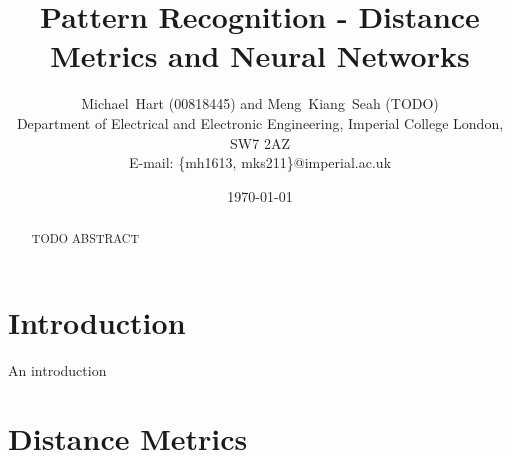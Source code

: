 \documentclass[a4paper, 10pt, conference]{ieeeconf}
\begin{document}
\title{Pattern Recognition - Distance Metrics and Neural Networks}
\author{Michael~Hart (00818445) and
        Meng~Kiang~Seah (TODO)
\\
        Department of Electrical and Electronic Engineering, 
        Imperial College London, 
        SW7 2AZ
\\        
        E-mail: \{mh1613, mks211\}@imperial.ac.uk}
\date{\today}




\maketitle


\begin{abstract}
TODO ABSTRACT
\end{abstract}

\section{Introduction}

An introduction

\section{Distance Metrics}

\end{document}
